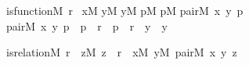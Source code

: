 \begin{isabelle}%
is{\isacharunderscore}{\kern0pt}function{\isacharparenleft}{\kern0pt}M{\isacharcomma}{\kern0pt}\ r{\isacharparenright}{\kern0pt}\ {\isasymequiv}\isanewline
{\isasymforall}x{\isacharbrackleft}{\kern0pt}M{\isacharbrackright}{\kern0pt}{\isachardot}{\kern0pt}\isanewline
\isaindent{\ \ \ }{\isasymforall}y{\isacharbrackleft}{\kern0pt}M{\isacharbrackright}{\kern0pt}{\isachardot}{\kern0pt}\isanewline
\isaindent{\ \ \ \ \ \ }{\isasymforall}y{\isacharprime}{\kern0pt}{\isacharbrackleft}{\kern0pt}M{\isacharbrackright}{\kern0pt}{\isachardot}{\kern0pt}\isanewline
\isaindent{\ \ \ \ \ \ \ \ \ }{\isasymforall}p{\isacharbrackleft}{\kern0pt}M{\isacharbrackright}{\kern0pt}{\isachardot}{\kern0pt}\isanewline
\isaindent{\ \ \ \ \ \ \ \ \ \ \ \ }{\isasymforall}p{\isacharprime}{\kern0pt}{\isacharbrackleft}{\kern0pt}M{\isacharbrackright}{\kern0pt}{\isachardot}{\kern0pt}\isanewline
\isaindent{\ \ \ \ \ \ \ \ \ \ \ \ \ \ \ }pair{\isacharparenleft}{\kern0pt}M{\isacharcomma}{\kern0pt}\ x{\isacharcomma}{\kern0pt}\ y{\isacharcomma}{\kern0pt}\ p{\isacharparenright}{\kern0pt}\ {\isasymlongrightarrow}\isanewline
\isaindent{\ \ \ \ \ \ \ \ \ \ \ \ \ \ \ }pair{\isacharparenleft}{\kern0pt}M{\isacharcomma}{\kern0pt}\ x{\isacharcomma}{\kern0pt}\ y{\isacharprime}{\kern0pt}{\isacharcomma}{\kern0pt}\ p{\isacharprime}{\kern0pt}{\isacharparenright}{\kern0pt}\ {\isasymlongrightarrow}\ p\ {\isasymin}\ r\ {\isasymlongrightarrow}\ p{\isacharprime}{\kern0pt}\ {\isasymin}\ r\ {\isasymlongrightarrow}\ y\ {\isacharequal}{\kern0pt}\ y{\isacharprime}{\kern0pt}%
\end{isabelle}%
\begin{isabelle}%
is{\isacharunderscore}{\kern0pt}relation{\isacharparenleft}{\kern0pt}M{\isacharcomma}{\kern0pt}\ r{\isacharparenright}{\kern0pt}\ {\isasymequiv}\ {\isasymforall}z{\isacharbrackleft}{\kern0pt}M{\isacharbrackright}{\kern0pt}{\isachardot}{\kern0pt}\ z\ {\isasymin}\ r\ {\isasymlongrightarrow}\ {\isacharparenleft}{\kern0pt}{\isasymexists}x{\isacharbrackleft}{\kern0pt}M{\isacharbrackright}{\kern0pt}{\isachardot}{\kern0pt}\ {\isasymexists}y{\isacharbrackleft}{\kern0pt}M{\isacharbrackright}{\kern0pt}{\isachardot}{\kern0pt}\ pair{\isacharparenleft}{\kern0pt}M{\isacharcomma}{\kern0pt}\ x{\isacharcomma}{\kern0pt}\ y{\isacharcomma}{\kern0pt}\ z{\isacharparenright}{\kern0pt}{\isacharparenright}{\kern0pt}%
\end{isabelle}%
